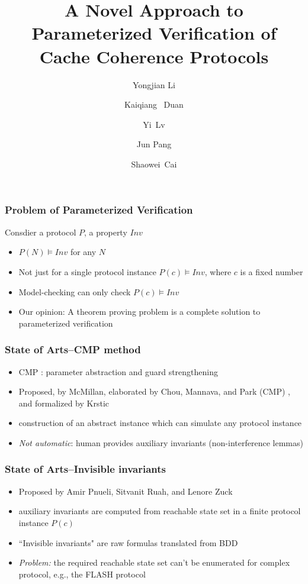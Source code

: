 \documentclass{beamer}
\begin{document}


\title{ A Novel Approach to Parameterized Verification of Cache Coherence Protocols}

\author{Yongjian Li \and  Kaiqiang~ Duan \and Yi~Lv \and Jun Pang \and Shaowei~Cai}


\frame{\titlepage}

\begin{frame}\frametitle{Problem of Parameterized Verification}
Consdier a protocol $P$, a property $Inv$
\begin{itemize}
\item  $P(N) \models Inv$ for any $N$
\item Not just for a single protocol instance  $P(c)\models Inv$, where $c$ is a fixed number
\item Model-checking can only check $P(c)\models Inv$
\item Our opinion: A theorem proving problem is a complete solution to parameterized verification
\end{itemize}
\end{frame}

\begin{frame}\frametitle{State of Arts--CMP method}
\begin{itemize}
\item CMP :  parameter abstraction and guard strengthening
\item Proposed, by McMillan, elaborated by Chou, Mannava, and Park (CMP) , and formalized
by Krstic
\item construction of an abstract instance which can simulate any protocol instance
\item \emph{Not automatic}: human provides auxiliary invariants (non-interference lemmas)
\end{itemize}
\end{frame}


\begin{frame}\frametitle{State of Arts--Invisible invariants }
\begin{itemize}
\item  Proposed by Amir Pnueli, Sitvanit Ruah, and Lenore Zuck
\item  auxiliary invariants are computed from reachable state set in a finite protocol
instance $P(c)$
\item ``Invisible invariants" are raw formulas translated from BDD
\item \emph{ Problem:} the required reachable state set can't be enumerated for complex protocol, e.g., the FLASH protocol
\end{itemize}
\end{frame}
\end{document}

